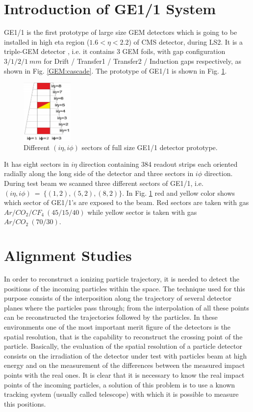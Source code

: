 \section{Introduction of GE1/1 System}
GE1/1 is the first prototype of large size GEM detectors which is going to be installed in high eta region ($1.6<\eta<2.2$) of CMS detector, during LS2. It is a triple-GEM detector \cite{Colaleo:2021453}, i.e. it contains 3 GEM foils, with gap configuration $3/1/2/1~mm$ for Drift / Transfer1 / Transfer2 / Induction gaps respectively, as shown in Fig. \ref{GEM:cascade}. The prototype of GE1/1 is shown in Fig. \ref{GE11}. 
\begin{figure}[!htbp]
\centering
\includegraphics[width=1.0in]{figures/GEM/GE11.png}
\caption{Different $(i\eta,i\phi)$ sectors of full size GE1/1 detector prototype.}
\label{GE11}
\end{figure}
It has eight sectors in $i\eta$ direction containing 384 readout strips each oriented radially along the long side of the detector and three sectors in $i\phi$ direction. During test beam we scanned three different sectors of GE1/1, i.e. $(i\eta,i\phi)~=~\{(1,2),(5,2),(8,2)\}$. In Fig. \ref{GE11} red and yellow color shows which sector of GE1/1's are exposed to the beam. Red sectors are taken with gas $Ar/CO_2/CF_4~(45/15/40)$ while yellow sector is taken with gas $Ar/CO_2~(70/30)$. 

\section{Alignment Studies}

In order to reconstruct a ionizing particle trajectory, it is needed to detect the positions of the incoming particles within the space. The technique used for this purpose consists of the interposition along the trajectory of several detector planes where the particles pass through; from the interpolation of all these points can be reconstructed the trajectories followed by the particles. In these environments one of the most important merit figure of the detectors is the spatial resolution, that is the capability to reconstruct the crossing point of the particle. Basically, the evaluation of the spatial resolution of a particle detector consists on the irradiation of the detector under test with particles beam at high energy and on the measurement of the differences between the measured impact points with the real ones. It is clear that it is necessary to know the real impact points of the incoming particles, a solution of this problem is to use a known tracking system (usually called telescope) with which it is possible to measure this positions.


